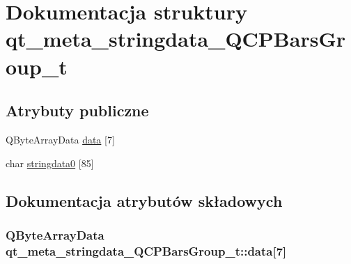 \hypertarget{structqt__meta__stringdata___q_c_p_bars_group__t}{}\section{Dokumentacja struktury qt\+\_\+meta\+\_\+stringdata\+\_\+\+Q\+C\+P\+Bars\+Group\+\_\+t}
\label{structqt__meta__stringdata___q_c_p_bars_group__t}
\subsection*{Atrybuty publiczne}
\begin{DoxyCompactItemize}
\item 
Q\+Byte\+Array\+Data \hyperlink{structqt__meta__stringdata___q_c_p_bars_group__t_a4af132fa7aa52aa1a2e32fed4547ee11}{data} \mbox{[}7\mbox{]}
\item 
char \hyperlink{structqt__meta__stringdata___q_c_p_bars_group__t_a2dd46435dea832cba9d6432a1b729650}{stringdata0} \mbox{[}85\mbox{]}
\end{DoxyCompactItemize}


\subsection{Dokumentacja atrybutów składowych}
\subsubsection[{\texorpdfstring{data}{data}}]{\setlength{\rightskip}{0pt plus 5cm}Q\+Byte\+Array\+Data qt\+\_\+meta\+\_\+stringdata\+\_\+\+Q\+C\+P\+Bars\+Group\+\_\+t\+::data\mbox{[}7\mbox{]}}\hypertarget{structqt__meta__stringdata___q_c_p_bars_group__t_a4af132fa7aa52aa1a2e32fed4547ee11}{}\label{structqt__meta__stringdata___q_c_p_bars_group__t_a4af132fa7aa52aa1a2e32fed4547ee11}
